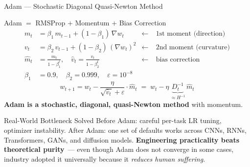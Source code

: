 \documentclass{beamer}
\begin{document}
\begin{frame}[shrink=10]{Adam --- Stochastic Diagonal Quasi-Newton Method}
  \begin{block}{Adam $=$ RMSProp $+$ Momentum $+$ Bias Correction}
    \begin{align*}
      m_t &= \beta_1\,m_{t-1} + (1-\beta_1)\,\nabla w_t
            &\leftarrow&\;\text{1st moment (direction)}\\
      v_t &= \beta_2\,v_{t-1} + (1-\beta_2)\,(\nabla w_t)^2
            &\leftarrow&\;\text{2nd moment (curvature)}\\[6pt]
      \hat{m}_t &= \frac{m_t}{1-\beta_1^t},
      \quad\hat{v}_t = \frac{v_t}{1-\beta_2^t}
            &\leftarrow&\;\text{bias correction}\\[4pt]
      \beta_1 &= 0.9,\quad\beta_2 = 0.999,\quad\varepsilon=10^{-8}
    \end{align*}
    \[
      \boxed{w_{t+1} = w_t
        - \frac{\eta}{\sqrt{\hat{v}_t}+\varepsilon}\cdot\hat{m}_t}
      \;=\; w_t - \eta\,\underbrace{D_t^{-1}}_{\approx H^{-1}}\,\hat{m}_t
    \]
    \textbf{Adam is a stochastic, diagonal, quasi-Newton method}
    with momentum.
  \end{block}

  \begin{alertblock}{Real-World Bottleneck Solved}
    Before Adam: careful per-task LR tuning, optimizer instability.
    After Adam: one set of defaults works across
    CNNs, RNNs, Transformers, GANs, and diffusion models.
    \textbf{Engineering practicality beats theoretical purity}~---
    even though Adam does not converge in some cases, industry
    adopted it universally because it \emph{reduces human suffering}.
  \end{alertblock}
\end{frame}
\end{document}
